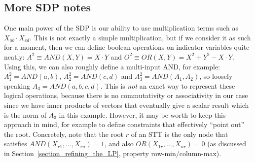 \subsection{More SDP notes}
One main power of the SDP is our ability to use multiplication terms such as $X_{ab} \cdot X_{cd}$. This is not exactly a simple  multiplication, but if we consider it as such for a moment, then we can define boolean operations on indicator variables quite neatly: $A^2 \equiv AND(X,Y) = X \cdot Y$ and $O^2 \equiv OR(X,Y) = X^2 + Y^2 - X \cdot Y$. Using this, we can also roughly define a multi-input AND, for example: $A_1^2 = AND(a,b)$, $A_2^2 = AND(c,d)$ and $A_3^2 = AND(A_1,A_2)$, so loosely speaking $A_3 = AND(a,b,c,d)$. This is \emph{not} an exact way to represent these logical operations, because there is no commutativity or associativity in our case since we have inner products of vectors that eventually give a scalar result which is the norm of $A_3$ in this example. However, it may be worth to keep this approach in mind, for example to define constraints that effectively ``point out'' the root. Concretely, note that the root $r$ of an STT is the only node that satisfies $AND(X_{r1},\ldots,X_{rn}) = 1$, and also $OR(X_{1r},\ldots,X_{nr}) = 0$ (as discussed in Section~\ref{section_refining_the_LP}, property row-min/column-max).